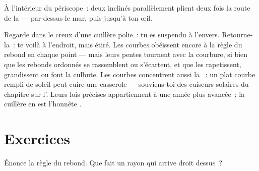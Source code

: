 \begin{omfigure}

{\small À l'intérieur du périscope~: deux  inclinés
parallèlement plient deux fois la route de la  --- par-dessus
le mur, puis jusqu'à ton œil.}
\end{omfigure}

\begin{remark}\label{rem:g5:mirrors-reflection:curved}
Regarde dans le creux d'une cuillère polie~: tu es suspendu à
l'envers. Retourne-la~: te voilà à l'endroit, mais étiré. Les 
courbes obéissent encore à la règle du rebond en chaque point ---
mais leurs pentes tournent avec la courbure, si bien que les rebonds
ordonnés se rassemblent ou s'écartent, et que les 
rapetissent, grandissent ou font la culbute. Les  courbes
concentrent aussi la ~: un plat courbe rempli de soleil peut
cuire une casserole --- souviens-toi des cuiseurs solaires du
chapitre sur l'. Leurs lois précises appartiennent à une année
plus avancée~; la cuillère en est l'honnête .
\end{remark}

\section{Exercices}

\begin{exercise}[$\star$]\label{exo:g5:mirrors-reflection:1}
Énonce la règle du rebond. Que fait un rayon qui arrive droit dessus~?
\end{exercise}

